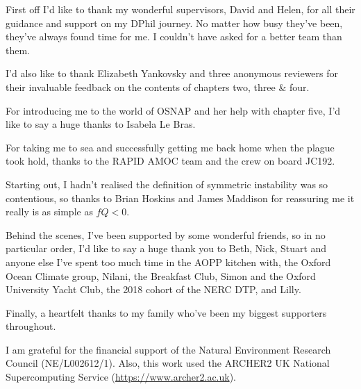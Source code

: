 \cleardoublepage
{}
{}
\begin{acknowledgements}
    \begin{spacing}{1.25}
    First off I'd like to thank my wonderful supervisors, David and Helen, for all their guidance and support on my DPhil journey. No matter how busy they've been, they've always found time for me. I couldn't have asked for a better team than them.

    I'd also like to thank Elizabeth Yankovsky and three anonymous reviewers for their invaluable feedback on the contents of chapters two, three \& four.
    
    For introducing me to the world of OSNAP and her help with chapter five, I'd like to say a huge thanks to Isabela Le Bras.
    
    For taking me to sea and successfully getting me back home when the plague took hold, thanks to the RAPID AMOC team and the crew on board JC192.
    
    Starting out, I hadn't realised the definition of symmetric instability was so contentious, so thanks to Brian Hoskins and James Maddison for reassuring me it really is as simple as $fQ < 0$.
    
    Behind the scenes, I've been supported by some wonderful friends, so in no particular order, I'd like to say a huge thank you to Beth, Nick, Stuart and anyone else I've spent too much time in the AOPP kitchen with, the Oxford Ocean Climate group, Nilani, the Breakfast Club, Simon and the Oxford University Yacht Club, the 2018 cohort of the NERC DTP, and Lilly.
    
    Finally, a heartfelt thanks to my family who've been my biggest supporters throughout.

    I am grateful for the financial support of the Natural Environment Research Council (NE/L002612/1). Also, this work used the ARCHER2 UK National Supercomputing Service (\url{https://www.archer2.ac.uk}).
    \end{spacing}
\end{acknowledgements}